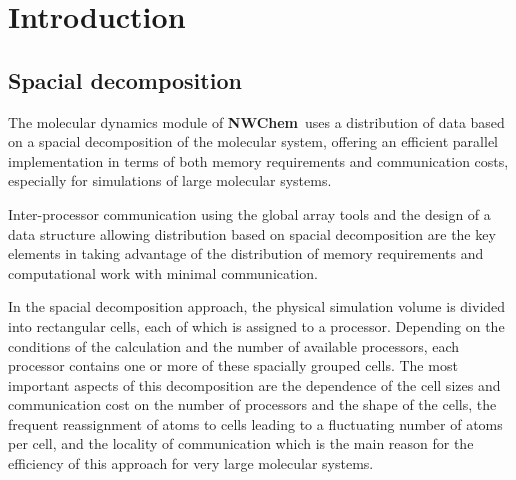 %
%
\label{sec:nwmd}
\newcommand{\mc}[3]{\mbox{\bf #3}}
\newcommand{\vb}[1]{\mbox{\verb.#1.}}
\newcommand{\none}{\multicolumn{2}{|c|}{ }}
\newcommand{\mcc}[1]{\multicolumn{2}{c}{#1}}
\def\bmu{\mbox{\boldmath $\mu$}}
\def\bE{\mbox{\bf E}}
\def\br{\mbox{\bf r}}
\def\tT{\tilde{T}}
\def\t{\tilde{1}}
\def\ip{i\prime}
\def\jp{j\prime}
\def\ipp{i\prime\prime}
\def\jpp{j\prime\prime}
\def\etal{{\sl et al.}}
\def\nwchem{{\bf NWChem}}
\def\prepare{{\bf prepare}}
\def\nwtop{{\bf nwtop}}
\def\nwrst{{\bf nwrst}}
\def\nwsgm{{\bf nwsgm}}

\section{Introduction}

\subsection{Spacial decomposition}
The molecular dynamics module of \nwchem\ uses a distribution of data
based on a spacial decomposition of the molecular system, offering
an efficient parallel implementation in terms of both memory 
requirements and communication costs, especially for simulations of 
large molecular systems.

Inter-processor communication using the global array tools and the
design of a data structure allowing distribution based on spacial
decomposition are the key elements in taking advantage of
the distribution of memory requirements and computational work with
minimal communication.

In the spacial decomposition approach, the physical simulation
volume is divided into rectangular cells, each of which is
assigned to a processor. Depending on the conditions of the 
calculation and the number of available processors, each processor 
contains one or more of these spacially grouped cells.
The most important aspects of this decomposition are the dependence 
of the cell sizes and communication cost on the number of processors 
and the shape of the cells, the frequent reassignment of atoms to 
cells leading to a fluctuating number of atoms per cell, and the 
locality of communication which is the main reason for the efficiency 
of this approach for very large molecular systems.

